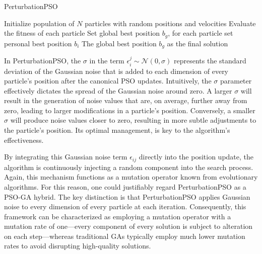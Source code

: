{\begin{algorithm}[H]
\caption{PerturbationPSO}\label{alg:perturbation}
Initialize population of \(N\) particles with random positions and velocities\;
Evaluate the fitness of each particle\;
Set global best position \(b_g\), for each particle set personal best position \(b_i\)\;
\Return The global best position \(b_g\) as the final solution\;
\end{algorithm}

\vspace{.835em}

\enlargethispage{.6\baselineskip}
In PerturbationPSO, the $\sigma$ in the term $\epsilon_{i}^{j} \sim \mathcal{N}(0, \sigma)$ represents the standard deviation of the Gaussian noise that is added to each dimension of every particle's position after the canonical PSO updates. Intuitively, the $\sigma$ parameter effectively dictates the spread of the Gaussian noise around zero. A larger $\sigma$ will result in the generation of noise values that are, on average, further away from zero, leading to larger modifications in a particle's position. Conversely, a smaller $\sigma$ will produce noise values closer to zero, resulting in more subtle adjustments to the particle's position. Its optimal management, is key to the algorithm's effectiveness.

By integrating this Gaussian noise term $\epsilon_{ij}$ directly into the position update, the algorithm is continuously injecting a random component into the search process. Again, this mechanism functions as a mutation operator known from evolutionary algorithms. For this reason, one could justifiably regard PerturbationPSO as a PSO-GA hybrid. The key distinction is that PerturbationPSO applies Gaussian noise to every dimension of every particle at each iteration. Consequently, this framework can be characterized as employing a mutation operator with a mutation rate of one---every component of every solution is subject to alteration on each step---whereas traditional GAs typically employ much lower mutation rates to avoid disrupting high-quality solutions.

}
